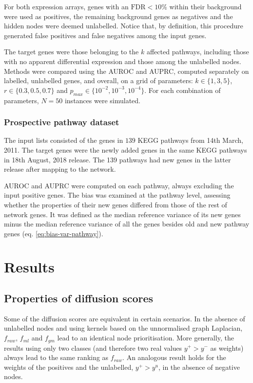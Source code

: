 \documentclass[final]{bioinfo}
\begin{document}
\begin{methods}
For both expression arrays, genes with an $ \textrm{FDR}<10\% $ within their background were used as positives, the remaining background genes as negatives and the hidden nodes were deemed unlabelled. 
Notice that, by definition, this procedure generated false positives and false negatives among the input genes. 

The target genes were those belonging to the $k$ affected pathways, including those with no apparent differential expression and those among the unlabelled nodes.
Methods were compared using the AUROC and AUPRC, computed separately on labelled, unlabelled genes, and overall, on a grid of parameters: $k \in \{1,3,5\}$, $r \in \{0.3,0.5,0.7\}$ and $p_{max} \in \{10^{-2},10^{-3},10^{-4}\}$. 
For each combination of parameters, $N = 50$ instances were simulated.

\subsubsection*{Prospective pathway dataset}

The input lists consisted of the genes in $139$ KEGG pathways from 14th March, 2011. 
The target genes were the newly added genes in the same KEGG pathways in 18th August, 2018 release.
The 139 pathways had new genes in the latter release after mapping to the network. 

AUROC and AUPRC were computed on each pathway, always excluding the input positive genes. 
The bias was examined at the pathway level, assessing whether the properties of their new genes differed from those of the rest of network genes. 
It was defined as the median reference variance of its new genes minus the median reference variance of all the genes besides old and new pathway genes (eq. \ref{eq:bias-var-pathway}). 

\end{methods}

\section{Results}

\subsection*{Properties of diffusion scores}

Some of the diffusion scores are equivalent in certain scenarios. 
In the absence of unlabelled nodes and using kernels based on the unnormalised graph Laplacian, $f_{raw}$, $f_{ml}$ and $f_{gm}$ lead to an identical node prioritisation. 
More generally, the results using only two classes (and therefore two real values $y^+ > y^-$ as weights) always lead to the same ranking as $f_{raw}$. 
An analogous result holds for the weights of the positives and the unlabelled, $y^+ > y^u$, in the absence of negative nodes. 
\end{document}
